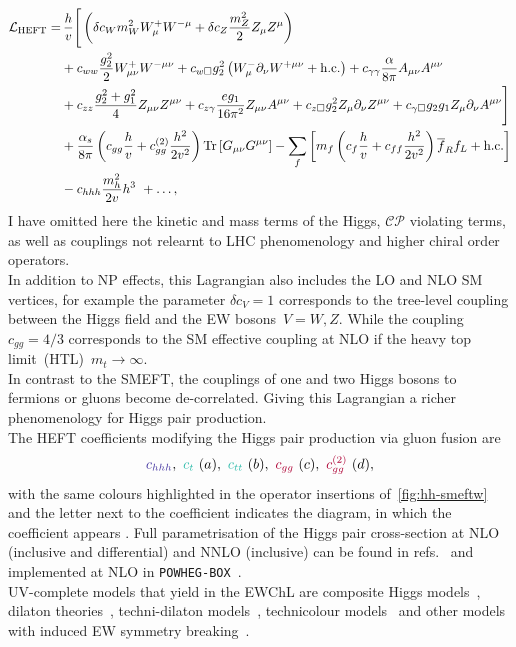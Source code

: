 \begin{align}\nonumber
	\mathcal{L}_{\mathrm{HEFT}} = & \, \frac{h}{v} \Bigg[  \left( \delta c_W m_W^2 W_{\mu}^+W^{-\mu} +\delta c_Z \frac{m_Z^2}{2} Z_\mu Z^\mu\right)  \\\nonumber
	&+c_{ww}\frac{g_2^2}{2}W_{\mu\nu}^+W^{-\mu\nu} + c_{w\square} g_2^2\left(W_{\mu}^-\partial_\nu W^{+\mu\nu} + \text{h.c.}\right) +  c_{\gamma\gamma}\frac{\alpha}{8 \pi}A_{\mu\nu}A^{\mu\nu} \\\nonumber
	& +c_{zz}\frac{g_2^2 + g_1^2}{4} Z_{\mu\nu}Z^{\mu\nu}+ c_{z\gamma}\frac{e g_1}{16 \pi^2}Z_{\mu\nu}A^{\mu\nu}
	+c_{z\square}g_2^2Z_\mu\partial_\nu Z^{\mu\nu}
	+c_{\gamma \square}g_2 g_1 Z_\mu\partial_\nu A^{\mu\nu}
	\Bigg]\\\nonumber
	&+ \frac{\alpha_s}{8 \pi} \left( c_{gg} \frac{h}{v} +  c_{gg}^{(2)} \frac{h^2}{2 v^2}\right) \mbox{Tr}\,[G_{\mu\nu} G^{\mu\nu}]
	-\sum_f \left[ m_f \left(c_f \frac{h}{v} + c _{ff} \frac{h^2}{2v^2}\right) \overline{f}_{R}f_{L}+\text{h.c.}\right]\\
	& - c_{hhh} \frac{m_h^2}{2 v} h^3\ + \dots,\label{eq:coupl_def}
\end{align}
I have omitted here the kinetic and mass terms of the Higgs, $\mathcal{CP}$ violating terms, as well as couplings not relearnt to LHC phenomenology and higher chiral order operators. \\
In addition to NP effects, this Lagrangian also includes the LO and NLO SM vertices, for example the parameter $\delta c_V=1$ corresponds to the tree-level coupling between the Higgs field and the EW bosons~$ V=W, Z$. While the coupling $c_{gg}= 4/3$ corresponds to the SM effective coupling at NLO if the heavy top limit~(HTL)~$m_t \to \infty$. \\
In contrast to the SMEFT, the couplings of one and two Higgs bosons to fermions or gluons become de-correlated. Giving this Lagrangian a richer phenomenology for Higgs pair production.  \\
The HEFT coefficients modifying the Higgs pair production via gluon fusion are 
\begin{equation}
\textcolor[HTML]{4334a0}{c_{hhh} }, \ 	\textcolor[HTML]{2ebbaa}{c_t}\ (a) , \  	\textcolor[HTML]{2ebbaa}{c_{tt}} \ (b), \  \textcolor[HTML]{ae0034}{c_{gg}} \ (c), \  \textcolor[HTML]{ae0034}{c_{gg}^{(2)}} \ (d),
\end{equation}
with the same colours highlighted in the operator insertions of~\autoref{fig:hh-smeftw} and the letter next to the coefficient indicates the diagram, in which the coefficient appears .  Full parametrisation of the Higgs pair cross-section at NLO (inclusive and differential) and NNLO (inclusive)  can be found in refs.~\cite{Buchalla:2018yce,Capozi:2019xsi,deFlorian:2021azd} and implemented at NLO in \texttt{POWHEG-BOX}~\cite{Heinrich:2020ckp}. \\ UV-complete models that yield in the EWChL are composite Higgs models~\cite{Contino:2010rs,Panico:2015jxa,AGASHE2005165}, dilaton  theories~\cite{PhysRevLett.100.111802}, techni-dilaton models~\cite{Habaa:2010rbs}, technicolour models~\cite{Delgado:2010bb} and other models with induced EW symmetry breaking~\cite{Galloway:2013dma,Chang:2014ida}.
